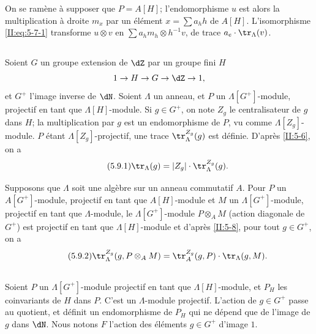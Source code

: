 On se ramène à supposer que $P=A[H]$; l'endomorphisme $u$ est alors la 
multiplication à droite $m_x$ par un élément $x=\sum a_h h$ de $A[H]$. 
L'isomorphisme \eqref{II:eq:5-7-1} transforme $u\otimes v$ en 
$\sum a_h m_h\otimes h^{-1} v$, de trace $a_e\cdot\tr_\Lambda(v)$. 





\subsection{}\label{II:5-9}

Soient $G$ un groupe extension de $\dZ$ par un groupe fini $H$
\[
  1 \to H \to G \to \dZ \to 1 \text{,}
\]
et $G^+$ l'image inverse de $\dN$. Soient $\Lambda$ un anneau, et $P$ un 
$\Lambda[G^+]$-module, projectif en tant que $\Lambda[H]$-module. Si 
$g\in G^+$, on note $Z_g$ le centralisateur de $g$ dans $H$; la multiplication 
par $g$ est un endomorphisme de $P$, vu comme $\Lambda[Z_g]$-module. $P$ étant 
$\Lambda[Z_g]$-projectif, une trace $\tr_\Lambda^{Z_g}(g)$ est définie. 
D'après \ref{II:5-6}, on a 
\begin{equation*}\tag{5.9.1}\label{II:eq:5-9-1}
  \tr_\Lambda(g) = |Z_g| \cdot \tr_\Lambda^{Z_g}(g) \text{.}
\end{equation*}

Supposons que $\Lambda$ soit une algèbre sur un anneau commutatif $A$. Pour 
$P$ un $A[G^+]$-module, projectif en tant que $A[H]$-module et $M$ un 
$\Lambda[G^+]$-module, projectif en tant que $\Lambda$-module, le 
$\Lambda[G^+]$-module $P\otimes_A M$ (action diagonale de $G^+$) est projectif 
en tant que $\Lambda[H]$-module et d'après \ref{II:5-8}, pour tout 
$g\in G^+$, on a 
\begin{equation*}\tag{5.9.2}\label{II:eq:5-9-2}
  \tr_\Lambda^{Z_g}(g,P\otimes_A M) = \tr_A^{Z_g}(g,P) \cdot \tr_\Lambda(g,M) \text{.}
\end{equation*}





\subsection{}\label{II:5-10}

Soient $P$ un $\Lambda[G^+]$-module projectif en tant que $\Lambda[H]$-module, 
et $P_H$ les coinvariants de $H$ dans $P$. C'est un $\Lambda$-module projectif. 
L'action de $g\in G^+$ passe au quotient, et définit un endomorphisme de 
$P_H$ qui ne dépend que de l'image de $g$ dans $\dN$. Nous notons $F$ 
l'action des éléments $g\in G^+$ d'image $1$. 





